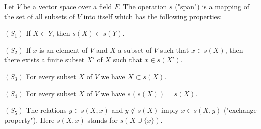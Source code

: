 Let $V$ be a vector space over a field $F$. The operation $s$ ("span") is a mapping of the set of all subsets of $V$ into itself which has the following properties:

$(S_1)$ If $X \subset Y$, then $s(X) \subset s(Y)$.

$(S_2)$ If $x$ is an element of $V$ and $X$ a subset of $V$ such that $x \in s(X)$, then there exists a finite subset $X'$ of $X$ such that $x \in s(X')$.

$(S_3)$ For every subset $X$ of $V$ we have $X \subset s(X)$.

$(S_4)$ For every subset $X$ of $V$ we have $s(s(X)) = s(X)$.

$(S_5)$ The relations $y \in s(X, x)$ and $y \notin s(X)$ imply $x \in s(X, y)$ ("exchange property"). Here $s(X, x)$ stands for $s(X \cup \{x\})$.
